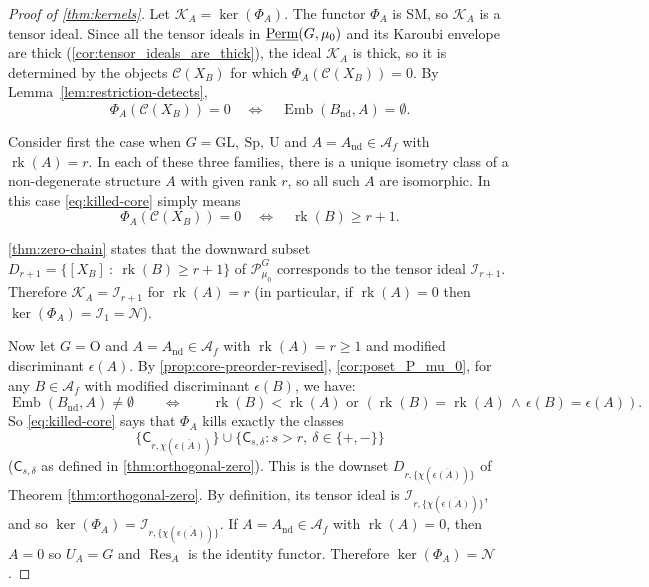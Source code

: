 \documentclass[11pt,a4paper]{amsart}
\theoremstyle{plain}%
\theoremstyle{definition}
\theoremstyle{remark}
\newcommand{\Res}{\operatorname{Res}}
\newcommand{\rk}{{\operatorname{rk}}}
\newcommand{\Perm}{\underline{{\rm Perm}}}
\newcommand{\Emb}{\operatorname{Emb}}
\newcommand{\I}{\mathcal{I}}
\newcommand{\N}{\mathcal N}
\newcommand{\nd}{\mathrm{nd}}
\begin{document}
\begin{proof}[Proof of \cref{thm:kernels}] Let $\mathcal K_A=\ker(\Phi_A)$.  The functor $\Phi_A$ is SM, so $\mathcal K_A$ is a tensor ideal. Since all the tensor ideals in $\Perm(G, \mu_0)$ and its Karoubi envelope are thick (\cref{cor:tensor_ideals_are_thick}), the ideal $\mathcal K_A$ is thick, so it is determined by the objects $\mathcal{C}(X_B)$ for which $\Phi_A(\mathcal{C}(X_B))=0$. By Lemma~\ref{lem:restriction-detects},
\begin{equation}\label{eq:killed-core}
 \Phi_A(\mathcal{C}(X_B))=0
 \quad\Longleftrightarrow\quad
 \Emb(B_{\nd}, A)=\emptyset.
\end{equation}

Consider first the case when $G=\mathrm{GL,~Sp,~U}$ and $A=A_{\nd}\in \mathcal{A}_f$ with $\rk(A)=r$.  In each of these three families, there is a unique isometry class of a non-degenerate structure $A$ with given rank $r$, so all such $A$ are isomorphic. In this case \eqref{eq:killed-core} simply means
\[
 \Phi_A(\mathcal{C}(X_B))=0
 \quad\Longleftrightarrow\quad
 \rk(B)\geq r+1.
\]

\cref{thm:zero-chain} states that the downward subset $D_{r+1}=\{[X_B]~:~\rk(B)\geq r+1\}$ of $\mathcal{P}^G_{\mu_0}$ corresponds to the tensor ideal $\I_{r+1}$. Therefore $\mathcal K_{A}=\I_{r+1}$ for $\rk(A)=r$ (in particular, if $\rk(A)=0$ then $\ker(\Phi_{A})=\I_1=\N$).

Now let $G=\mathrm{O}$ and $A=A_{\nd}\in \mathcal{A}_f$ with $\rk(A)=r{\geq 1}$ and modified discriminant $\epsilon(A)$.  By \cref{prop:core-preorder-revised}, \cref{cor:poset_P_mu_0}, for any $B\in \mathcal{A}_f$ with modified discriminant $\epsilon(B)$, we have: 
$$\Emb({B_{\nd}}, A)\neq \emptyset \qquad \Longleftrightarrow \qquad \rk(B)<\rk(A) \text{ or } (\rk(B)=\rk(A)\,\wedge \, \epsilon(B)=\epsilon(A)).$$
So \eqref{eq:killed-core} says that $\Phi_{A}$ kills exactly the classes
\[
 \{\mathsf C_{r,\chi(\overline{\epsilon(A)})}\}
 \cup
 \{\mathsf C_{s,\delta}:s>r,\ \delta\in\{+,-\}\}
\]
($\mathsf C_{s,\delta}$ as defined in \cref{thm:orthogonal-zero}). This is the downset $D_{r,\{\chi(\overline{\epsilon(A)})\}}$ of Theorem \ref{thm:orthogonal-zero}.  By definition, its tensor ideal is $\I_{{r,\{\chi(\overline{\epsilon(A)})\}}}$, and so  $\ker(\Phi_{A})=\I_{{r,\{\chi(\overline{\epsilon(A)})\}}}$. If $A=A_{\nd}\in \mathcal{A}_f$ with $\rk(A)=0$, then $A=0$ so $U_A=G$ and $\Res_A$ is the identity functor. Therefore $\ker (\Phi_A)=\N$.
\end{proof}
\end{document}
